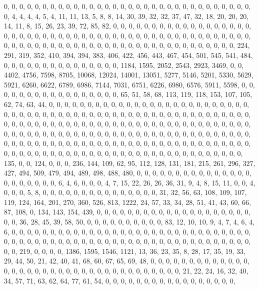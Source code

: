 \documentclass[
]{article}
\begin{document}
0, 0, 0, 0, 0, 0, 0, 0, 0, 0, 0, 0, 0, 0, 0, 0, 0, 0, 0, 0, 0, 0, 0, 0,
0, 0, 0, 0, 0, 0, 0, 0, 0, 4, 4, 4, 4, 5, 4, 11, 11, 13, 5, 8, 8, 14,
30, 39, 32, 32, 37, 47, 32, 18, 20, 20, 20, 14, 11, 8, 15, 26, 23, 39,
72, 85, 82, 0, 0, 0, 0, 0, 0, 0, 0, 0, 0, 0, 0, 0, 0, 0, 0, 0, 0, 0, 0,
0, 0, 0, 0, 0, 0, 0, 0, 0, 0, 0, 0, 0, 0, 0, 0, 0, 0, 0, 0, 0, 0, 0, 0,
0, 0, 0, 0, 0, 0, 0, 0, 0, 0, 0, 0, 0, 0, 0, 0, 0, 0, 0, 0, 0, 0, 0, 0,
0, 0, 0, 0, 0, 0, 0, 0, 0, 0, 0, 0, 224, 291, 319, 352, 410, 394, 394,
383, 406, 422, 456, 443, 467, 454, 501, 545, 541, 484, 0, 0, 0, 0, 0, 0,
0, 0, 0, 0, 0, 0, 0, 0, 0, 1184, 1595, 2052, 2543, 2923, 3469, 0, 0,
4402, 4756, 7598, 8705, 10068, 12024, 14001, 13051, 5277, 5146, 5201,
5330, 5629, 5921, 6260, 6622, 6789, 6986, 7144, 7031, 6751, 6226, 6980,
6576, 5911, 5598, 0, 0, 0, 0, 0, 0, 0, 0, 0, 0, 0, 0, 0, 0, 0, 0, 0, 65,
51, 58, 68, 113, 119, 118, 153, 107, 105, 62, 74, 63, 44, 0, 0, 0, 0, 0,
0, 0, 0, 0, 0, 0, 0, 0, 0, 0, 0, 0, 0, 0, 0, 0, 0, 0, 0, 0, 0, 0, 0, 0,
0, 0, 0, 0, 0, 0, 0, 0, 0, 0, 0, 0, 0, 0, 0, 0, 0, 0, 0, 0, 0, 0, 0, 0,
0, 0, 0, 0, 0, 0, 0, 0, 0, 0, 0, 0, 0, 0, 0, 0, 0, 0, 0, 0, 0, 0, 0, 0,
0, 0, 0, 0, 0, 0, 0, 0, 0, 0, 0, 0, 0, 0, 0, 0, 0, 0, 0, 0, 0, 0, 0, 0,
0, 0, 0, 0, 0, 0, 0, 0, 0, 0, 0, 0, 0, 0, 0, 0, 0, 0, 0, 0, 0, 0, 0, 0,
0, 0, 0, 0, 0, 0, 0, 0, 0, 0, 0, 0, 0, 0, 0, 0, 0, 0, 0, 0, 0, 0, 0, 0,
0, 0, 0, 0, 0, 0, 0, 0, 0, 0, 0, 0, 0, 0, 0, 0, 0, 0, 0, 0, 0, 0, 0, 0,
0, 0, 0, 0, 0, 0, 0, 0, 0, 0, 0, 0, 135, 0, 0, 124, 0, 0, 0, 236, 144,
109, 62, 95, 112, 128, 131, 181, 215, 261, 296, 327, 427, 494, 509, 479,
494, 489, 498, 488, 480, 0, 0, 0, 0, 0, 0, 0, 0, 0, 0, 0, 0, 0, 0, 0, 0,
0, 0, 0, 0, 0, 0, 6, 4, 6, 0, 0, 0, 4, 7, 15, 22, 26, 26, 36, 31, 9, 4,
8, 15, 11, 0, 0, 4, 0, 0, 0, 5, 8, 0, 0, 0, 0, 0, 0, 0, 0, 0, 0, 0, 0,
0, 0, 0, 31, 32, 56, 63, 108, 109, 107, 119, 124, 164, 201, 270, 360,
526, 813, 1222, 24, 57, 33, 34, 28, 51, 41, 43, 60, 66, 87, 108, 0, 134,
143, 154, 439, 0, 0, 0, 0, 0, 0, 0, 0, 0, 0, 0, 0, 0, 0, 0, 0, 0, 0, 0,
0, 0, 0, 36, 28, 45, 39, 58, 50, 0, 0, 0, 0, 0, 0, 0, 0, 0, 0, 83, 12,
10, 10, 9, 4, 7, 4, 6, 4, 6, 0, 0, 0, 0, 0, 0, 0, 0, 0, 0, 0, 0, 0, 0,
0, 0, 0, 0, 0, 0, 0, 0, 0, 0, 0, 0, 0, 0, 0, 0, 0, 0, 0, 0, 0, 0, 0, 0,
0, 0, 0, 0, 0, 0, 0, 0, 0, 0, 0, 0, 0, 0, 0, 0, 0, 0, 0, 0, 0, 0, 0, 0,
0, 0, 0, 219, 0, 0, 0, 0, 1386, 1595, 1546, 1121, 13, 36, 23, 35, 8, 28,
17, 35, 19, 33, 29, 44, 50, 21, 42, 40, 41, 68, 60, 67, 65, 69, 48, 0,
0, 0, 0, 0, 0, 0, 0, 0, 0, 0, 0, 0, 0, 0, 0, 0, 0, 0, 0, 0, 0, 0, 0, 0,
0, 0, 0, 0, 0, 0, 0, 0, 0, 0, 0, 21, 22, 24, 16, 32, 40, 34, 57, 71, 63,
62, 64, 77, 61, 54, 0, 0, 0, 0, 0, 0, 0, 0, 0, 0, 0, 0, 0, 0, 0, 0, 0,
\end{document}
